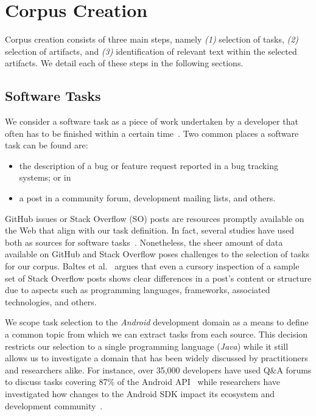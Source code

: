 \section{Corpus Creation}
\label{cp4:corpus-creation}

Corpus creation consists of three main steps, namely \textit{(1)} selection of tasks, \textit{(2)} selection of artifacts, and \textit{(3)} identification of relevant text within the selected artifacts. We detail each of these steps in the following sections.




\subsection{Software Tasks}
\label{cp4:corpus-tasks}


We consider a software task as a piece of work undertaken by a developer that often has to be finished within a certain time~\cite{2004merriam}.
Two common places a software task can be found are:

\begin{itemize}
    \item the description of a bug or feature request reported in a bug tracking systems; or in
    \item a post in a community forum, development mailing lists, and others.
\end{itemize}

GitHub issues or Stack Overflow (SO) posts are resources promptly available on the Web that align with our task definition.
In fact, several studies have used both as sources for software tasks~\cite{Arya2019, baltes2019, nadi2020, Xu2017}. Nonetheless, the sheer amount of data available on GitHub and Stack Overflow poses challenges to the selection of tasks for our corpus.
Baltes et al.~\cite{baltes2019} argues that even a cursory inspection of a sample set
of Stack Overflow posts shows clear differences in a post's content or structure due to aspects such as programming languages, frameworks, associated technologies, and others.


We scope task selection to
the \textit{Android} development domain as a means to define a common topic from which we can extract tasks from each source. This decision
restricts our selection to a single programming language (\textit{Java})
while it still allows us to investigate a domain that has been
widely discussed by practitioners and researchers alike.
For instance, over 35,000 developers have used Q\&A forums to discuss tasks covering 87\% of the Android API~\cite{parnin2012}
while researchers have investigated how changes to the Android SDK impact its ecosystem and development community~\cite{linares2014, bavota2014b, mcdonnell2013}.


